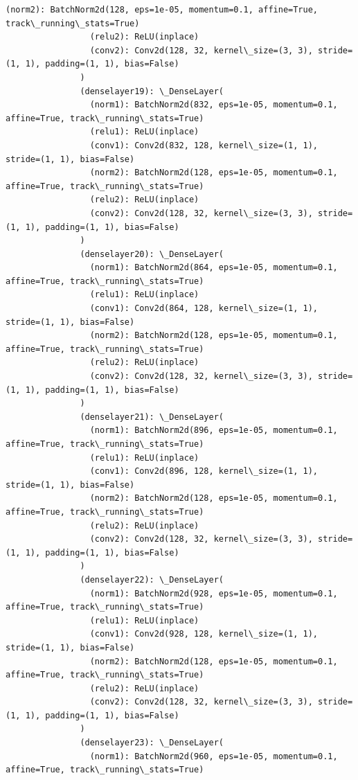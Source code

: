 \documentclass[11pt]{article}
\begin{document}
\begin{Verbatim}[commandchars=\\\{\}]
                 (norm2): BatchNorm2d(128, eps=1e-05, momentum=0.1, affine=True, track\_running\_stats=True)
                 (relu2): ReLU(inplace)
                 (conv2): Conv2d(128, 32, kernel\_size=(3, 3), stride=(1, 1), padding=(1, 1), bias=False)
               )
               (denselayer19): \_DenseLayer(
                 (norm1): BatchNorm2d(832, eps=1e-05, momentum=0.1, affine=True, track\_running\_stats=True)
                 (relu1): ReLU(inplace)
                 (conv1): Conv2d(832, 128, kernel\_size=(1, 1), stride=(1, 1), bias=False)
                 (norm2): BatchNorm2d(128, eps=1e-05, momentum=0.1, affine=True, track\_running\_stats=True)
                 (relu2): ReLU(inplace)
                 (conv2): Conv2d(128, 32, kernel\_size=(3, 3), stride=(1, 1), padding=(1, 1), bias=False)
               )
               (denselayer20): \_DenseLayer(
                 (norm1): BatchNorm2d(864, eps=1e-05, momentum=0.1, affine=True, track\_running\_stats=True)
                 (relu1): ReLU(inplace)
                 (conv1): Conv2d(864, 128, kernel\_size=(1, 1), stride=(1, 1), bias=False)
                 (norm2): BatchNorm2d(128, eps=1e-05, momentum=0.1, affine=True, track\_running\_stats=True)
                 (relu2): ReLU(inplace)
                 (conv2): Conv2d(128, 32, kernel\_size=(3, 3), stride=(1, 1), padding=(1, 1), bias=False)
               )
               (denselayer21): \_DenseLayer(
                 (norm1): BatchNorm2d(896, eps=1e-05, momentum=0.1, affine=True, track\_running\_stats=True)
                 (relu1): ReLU(inplace)
                 (conv1): Conv2d(896, 128, kernel\_size=(1, 1), stride=(1, 1), bias=False)
                 (norm2): BatchNorm2d(128, eps=1e-05, momentum=0.1, affine=True, track\_running\_stats=True)
                 (relu2): ReLU(inplace)
                 (conv2): Conv2d(128, 32, kernel\_size=(3, 3), stride=(1, 1), padding=(1, 1), bias=False)
               )
               (denselayer22): \_DenseLayer(
                 (norm1): BatchNorm2d(928, eps=1e-05, momentum=0.1, affine=True, track\_running\_stats=True)
                 (relu1): ReLU(inplace)
                 (conv1): Conv2d(928, 128, kernel\_size=(1, 1), stride=(1, 1), bias=False)
                 (norm2): BatchNorm2d(128, eps=1e-05, momentum=0.1, affine=True, track\_running\_stats=True)
                 (relu2): ReLU(inplace)
                 (conv2): Conv2d(128, 32, kernel\_size=(3, 3), stride=(1, 1), padding=(1, 1), bias=False)
               )
               (denselayer23): \_DenseLayer(
                 (norm1): BatchNorm2d(960, eps=1e-05, momentum=0.1, affine=True, track\_running\_stats=True)

\end{Verbatim}
\end{document}
